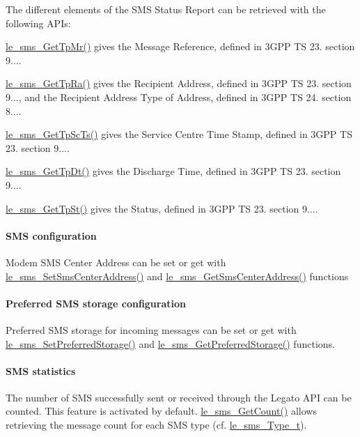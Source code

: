 The different elements of the S\+MS Status Report can be retrieved with the following A\+P\+Is\+:
\begin{DoxyItemize}
\item \hyperlink{le__sms__interface_8h_aa69393d6233b862f1196e6f65d0c45ba}{le\+\_\+sms\+\_\+\+Get\+Tp\+Mr()} gives the Message Reference, defined in 3\+G\+PP TS 23. section 9....
\item \hyperlink{le__sms__interface_8h_acbcc4f0517d19ea9b01813ae5da068c7}{le\+\_\+sms\+\_\+\+Get\+Tp\+Ra()} gives the Recipient Address, defined in 3\+G\+PP TS 23. section 9..., and the Recipient Address Type of Address, defined in 3\+G\+PP TS 24. section 8....
\item \hyperlink{le__sms__interface_8h_a7420855708637a4c35d36a20d1f5146d}{le\+\_\+sms\+\_\+\+Get\+Tp\+Sc\+Ts()} gives the Service Centre Time Stamp, defined in 3\+G\+PP TS 23. section 9....
\item \hyperlink{le__sms__interface_8h_ae3f6f7e4d53e171b3d8c62dcec9cc0c6}{le\+\_\+sms\+\_\+\+Get\+Tp\+Dt()} gives the Discharge Time, defined in 3\+G\+PP TS 23. section 9....
\item \hyperlink{le__sms__interface_8h_a8ef30b42f4e23f568cde8b60abe05709}{le\+\_\+sms\+\_\+\+Get\+Tp\+St()} gives the Status, defined in 3\+G\+PP TS 23. section 9....
\end{DoxyItemize}\hypertarget{c_sms_le_sms_ops_configuration}{}\paragraph{S\+M\+S configuration}\label{c_sms_le_sms_ops_configuration}
Modem S\+MS Center Address can be set or get with \hyperlink{le__sms__interface_8h_ac26c1b63cd99291dcb912ca98c0eb153}{le\+\_\+sms\+\_\+\+Set\+Sms\+Center\+Address()} and \hyperlink{le__sms__interface_8h_ae46b8ea579c788950049948edf1110b6}{le\+\_\+sms\+\_\+\+Get\+Sms\+Center\+Address()} functions\hypertarget{c_sms_le_sms_ops_storage_configuration}{}\paragraph{Preferred S\+M\+S storage configuration}\label{c_sms_le_sms_ops_storage_configuration}
Preferred S\+MS storage for incoming messages can be set or get with \hyperlink{le__sms__interface_8h_a05e4196eb01d4d36ed2412c6eedc406e}{le\+\_\+sms\+\_\+\+Set\+Preferred\+Storage()} and \hyperlink{le__sms__interface_8h_a5275b917903dbd1d782867f42d256c55}{le\+\_\+sms\+\_\+\+Get\+Preferred\+Storage()} functions.\hypertarget{c_sms_le_sms_ops_statistics}{}\paragraph{S\+M\+S statistics}\label{c_sms_le_sms_ops_statistics}
The number of S\+MS successfully sent or received through the Legato A\+PI can be counted. This feature is activated by default. \hyperlink{le__sms__interface_8h_ade1b38b464c14cca08cd1fc330a6d8e3}{le\+\_\+sms\+\_\+\+Get\+Count()} allows retrieving the message count for each S\+MS type (cf. \hyperlink{le__sms__interface_8h_a9001c5bc939bda5d5865e363bdf7662c}{le\+\_\+sms\+\_\+\+Type\+\_\+t}).

